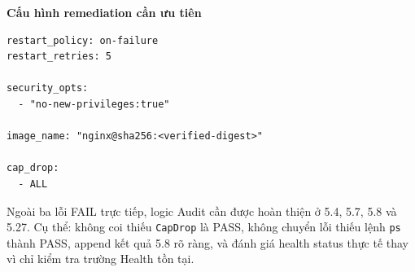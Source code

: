 \noindent\textbf{Cấu hình remediation cần ưu tiên}

\begin{verbatim}
restart_policy: on-failure
restart_retries: 5

security_opts:
  - "no-new-privileges:true"

image_name: "nginx@sha256:<verified-digest>"

cap_drop:
  - ALL
\end{verbatim}

Ngoài ba lỗi FAIL trực tiếp, logic Audit cần được hoàn thiện ở 5.4, 5.7, 5.8 và 5.27. Cụ thể: không coi thiếu \texttt{CapDrop} là PASS, không chuyển lỗi thiếu lệnh \texttt{ps} thành PASS, append kết quả 5.8 rõ ràng, và đánh giá health status thực tế thay vì chỉ kiểm tra trường Health tồn tại.
